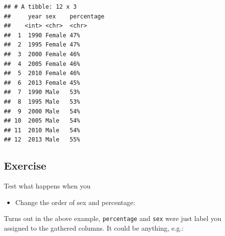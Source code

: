 \documentclass[12pt,]{krantz}
\makeatletter
\newenvironment{Shaded}{\begin{snugshade}}{\end{snugshade}}
\newcommand{\DataTypeTok}[1]{\textcolor[rgb]{0.13,0.29,0.53}{#1}}
\newcommand{\KeywordTok}[1]{\textcolor[rgb]{0.13,0.29,0.53}{\textbf{#1}}}
\newcommand{\NormalTok}[1]{#1}
\newcommand{\OperatorTok}[1]{\textcolor[rgb]{0.81,0.36,0.00}{\textbf{#1}}}
\newcommand{\StringTok}[1]{\textcolor[rgb]{0.31,0.60,0.02}{#1}}
\providecommand{\tightlist}{%
  \setlength{\itemsep}{0pt}\setlength{\parskip}{0pt}}
\newenvironment{kframe}{%
\medskip{}
\setlength{\fboxsep}{.8em}
 \def\at@end@of@kframe{}%
 \ifinner\ifhmode%
  \def\at@end@of@kframe{\end{minipage}}%
  \begin{minipage}{\columnwidth}%
 \fi\fi%
 \def\FrameCommand##1{\hskip\@totalleftmargin \hskip-\fboxsep
 \colorbox{shadecolor}{##1}\hskip-\fboxsep
     \hskip-\linewidth \hskip-\@totalleftmargin \hskip\columnwidth}%
 \MakeFramed {\advance\hsize-\width
   \@totalleftmargin\z@ \linewidth\hsize
   \@setminipage}}%
 {\par\unskip\endMakeFramed%
 \at@end@of@kframe}
\renewenvironment{Shaded}{\begin{kframe}}{\end{kframe}}
\theoremstyle{definition}
\theoremstyle{definition}
\theoremstyle{definition}
\theoremstyle{remark}
\makeatother
\begin{document}
\begin{Shaded}
\end{Shaded}

\begin{verbatim}
## # A tibble: 12 x 3
##     year sex    percentage
##    <int> <chr>  <chr>     
##  1  1990 Female 47%       
##  2  1995 Female 47%       
##  3  2000 Female 46%       
##  4  2005 Female 46%       
##  5  2010 Female 46%       
##  6  2013 Female 45%       
##  7  1990 Male   53%       
##  8  1995 Male   53%       
##  9  2000 Male   54%       
## 10  2005 Male   54%       
## 11  2010 Male   54%       
## 12  2013 Male   55%
\end{verbatim}

\hypertarget{exercise-15}{%
\subsection{Exercise}\label{exercise-15}}

Test what happens when you

\begin{itemize}
\tightlist
\item
  Change the order of sex and percentage:
\end{itemize}

\begin{Shaded}
\end{Shaded}

Turns out in the above example, \texttt{percentage} and \texttt{sex}
were just label you assigned to the gathered columns. It could be
anything, e.g.:

\begin{Shaded}
\end{Shaded}
\end{document}
